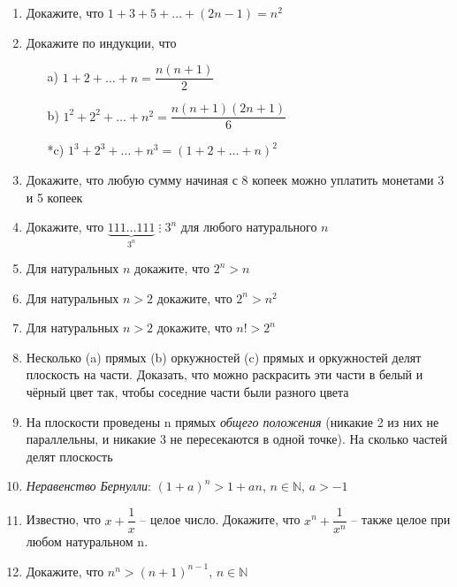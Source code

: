\documentclass{article}
\begin{document}
	
	\begin{enumerate}[label*=\protect\fbox{\arabic{enumi}}]
		
		\item Докажите, что $1 + 3 + 5 + \dots + (2n - 1) = n^2$
		
		\item Докажите по индукции, что
		\begin{enumerate}
			\item[a)] $1 + 2 + \dots + n =\dfrac{n (n+1)}{2}$
			
			\item[b)] $1^2 + 2^2 + \dots + n^2 =\dfrac{n (n+1)(2n + 1)}{6}$
			
			\item[*c)] $1^3 + 2^3 + \dots + n^3 =(1 + 2 + \dots + n) ^ 2$
		\end{enumerate}
	
		\item Докажите, что любую сумму начиная с 8 копеек можно уплатить монетами 3 и 5 копеек
	
		\item Докажите, что $\underbrace{111\dots111}_{3^n}\;\vdots\; 3^n$ для любого натурального $n$
		
		\item Для натуральных $n$ докажите, что $2^n > n$
		
		\item Для натуральных $n > 2$ докажите, что $2^n > n^2$
		
		\item Для натуральных $n > 2$ докажите, что $n! > 2^n$
		
		\item Несколько (a) прямых (b) оркужностей (c) прямых и оркужностей делят плоскость на части. Доказать, что можно раскрасить эти части в белый и чёрный цвет так, чтобы соседние части были разного цвета
		
		\item На плоскости проведены n прямых \textit{общего положения} (никакие 2 из них не параллельны, и никакие 3 не пересекаются в одной точке). На сколько частей делят плоскость 
		
		\item \textit{Неравенство Бернулли}: $(1+a)^n>1+an$, $n \in \mathbb{N}$, $a > - 1$
		
		\item Известно, что  $x + \dfrac{1}{x}$  – целое число. Докажите, что  $x^n + \dfrac{1}{x^n}$  – также целое при любом натуральном n.
		
		\item Докажите, что $n^n > (n + 1)^{n - 1}$, $n \in \mathbb{N}$
		
		
		
	\end{enumerate}
\end{document}
